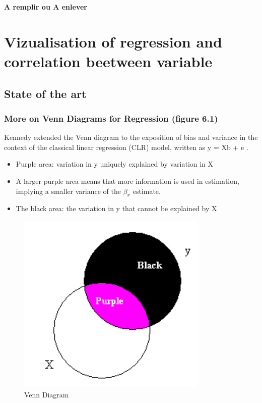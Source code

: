\documentclass[
]{report}
\providecommand{\tightlist}{%
  \setlength{\itemsep}{0pt}\setlength{\parskip}{0pt}}
\begin{document}
\textbf{A remplir ou A enlever}

\hypertarget{vizualisation-of-regression-and-correlation-beetween-variable}{%
\chapter{Vizualisation of regression and correlation beetween variable}\label{vizualisation-of-regression-and-correlation-beetween-variable}}

\hypertarget{state-of-the-art-1}{%
\section{State of the art}\label{state-of-the-art-1}}

\hypertarget{more-on-venn-diagrams-for-regression-figure-6.1}{%
\subsection{More on Venn Diagrams for Regression (figure 6.1)}\label{more-on-venn-diagrams-for-regression-figure-6.1}}

Kennedy \citep{kennedy} extended the Venn diagram to the exposition of bias and variance in the context of the classical linear regression (CLR) model, written as y = Xb + e .

\begin{itemize}
\tightlist
\item
  Purple area: variation in y uniquely explained by variation in X
\item
  A larger purple area means that more information is used in estimation, implying a smaller variance of the \(\beta_x\) estimate.
\item
  The black area: the variation in y that cannot be explained by X
\end{itemize}

\begin{figure}
    \centering
    \includegraphics[width= 250 pt]{vennken.PNG}
    \caption{Venn Diagram}
\end{figure}
\end{document}

